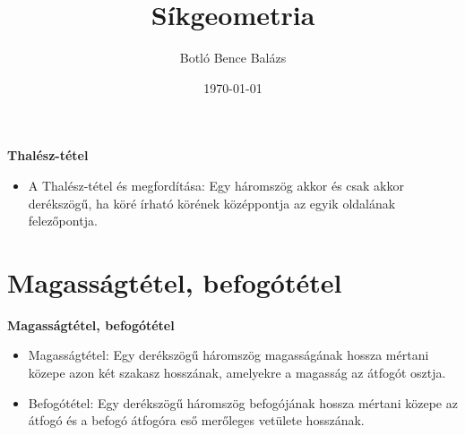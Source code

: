 \documentclass[11pt]{beamer}
\title{Síkgeometria}
\author{Botló Bence Balázs}
\institute{Selye János Egyetem}
\date{\today}
\begin{document}
\frame{\maketitle}
\frame{\tableofcontents}
\begin{frame}[<+->]
\begin{block}{\textbf{Thalész-tétel}}
\begin{itemize}[label=$\circ$]
\item A Thalész-tétel és megfordítása: Egy háromszög akkor és csak akkor derékszögű, ha köré írható körének középpontja az egyik oldalának felezőpontja.
\end{itemize}
\end{block}
\end{frame}

\section{\textbf{Magasságtétel, befogótétel}}
\begin{frame}[<+->]
\begin{block}{\textbf{Magasságtétel, befogótétel}}

\begin{itemize}[label=$\circ$]
\item Magasságtétel: Egy derékszögű háromszög magasságának hossza mértani közepe azon két szakasz hosszának, amelyekre a magasság az átfogót osztja.
\item Befogótétel: Egy derékszögű háromszög befogójának hossza mértani közepe az átfogó és a befogó átfogóra eső merőleges vetülete hosszának.
\end{itemize}
\end{block}
\end{frame}
\end{document}
